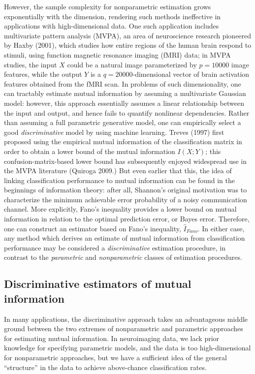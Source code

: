 \documentclass{article}
\begin{document}
However, the sample complexity for nonparametric estimation grows
exponentially with the dimension, rendering such methods ineffective
in applications with high-dimensional data.  One such application
includes multivariate pattern analysis (MVPA), an area of neuroscience
research pioneered by Haxby (2001), which studies how entire regions
of the human brain respond to stimuli, using function magnetic
resonance imaging (fMRI) data; in MVPA studies, the input $X$ could be
a natural image parameterized by $p = 10000$ image features, while the
output $Y$ is a $q=20000$-dimensional vector of brain activation
features obtained from the fMRI scan.  In problems of such
dimensionality, one can tractably estimate mutual information by
assuming a multivariate Gaussian model: however, this approach
essentially assumes a linear relationship between the input and
output, and hence fails to quantify nonlinear dependencies.  Rather
than assuming a full parametric generative model, one can empirically
select a good \emph{discriminative} model by using machine learning.
Treves (1997) first proposed using the empirical mutual information of
the classification matrix in order to obtain a lower bound of the
mutual information $I(X; Y)$; this confusion-matrix-based lower bound
has subsequently enjoyed widespread use in the MVPA literature
(Quiroga 2009.)  But even earlier that this, the idea of linking
classification performance to mutual information can be found in the
beginnings of information theory: after all, Shannon's original
motivation was to characterize the minimum achievable error
probability of a noisy communication channel.  More explicitly, Fano's
inequality provides a lower bound on mutual information in relation to
the optimal prediction error, or Bayes error.   Therefore, one can construct an estimator based on Fano's inequality, $\hat{I}_{Fano}$.  In either case, any method which derives an estimate of mutual information
from classification performance may be considered a \emph{discriminative} estimation procedure, in contrast to the \emph{parametric} and
\emph{nonparametric} classes of estimation procedures.  

\subsection{Discriminative estimators of mutual information}

In many applications, the
discriminative approach takes an advantageous middle ground between
the two extremes of nonparametric and parametric approaches for
estimating mutual information. In neuroimaging data, we lack prior
knowledge for specifying parametric models, and the data is too
high-dimensional for nonparametric approaches, but we have a
sufficient idea of the general ``structure'' in the data to achieve
above-chance classification rates.
\end{document}
